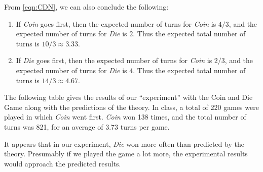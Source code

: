 \documentclass[reqno]{immbook}
\numberwithin{equation}{chapter}
\numberwithin{question}{section}
\numberwithin{theorem}{chapter}
\numberwithin{figure}{chapter}
\theoremstyle{definition}
\begin{document}
From \eqref{eqn:CDN}, we can also conclude the following:
\begin{enumerate}
\item If \emph{Coin} goes first, then the expected number of
turns for \emph{Coin} is $4/3$, and the expected number of
turns for \emph{Die} is $2$.  Thus the expected total number
of turns is $10/3\approx 3.33$.
\item If \emph{Die} goes first, then the expected number of
turns for \emph{Coin} is $2/3$, and the expected number of
turns for \emph{Die} is $4$.  Thus the expected total number
of turns is $14/3\approx 4.67$.
\end{enumerate}

The following table gives the results of our
``experiment'' with the Coin and Die Game along with
the predictions of the theory.
In class, a total of 220 games were played in which
\emph{Coin} went first.
\emph{Coin} won 138 times, and the total number of
turns was 821, for an average of 3.73 turns per game.

\medskip
\centerline{
}

\medskip
It appears that in our experiment, \emph{Die} won more
often than predicted by the theory.
Presumably if we played the game a lot more, the
experimental results would approach the predicted results.
\end{document}
